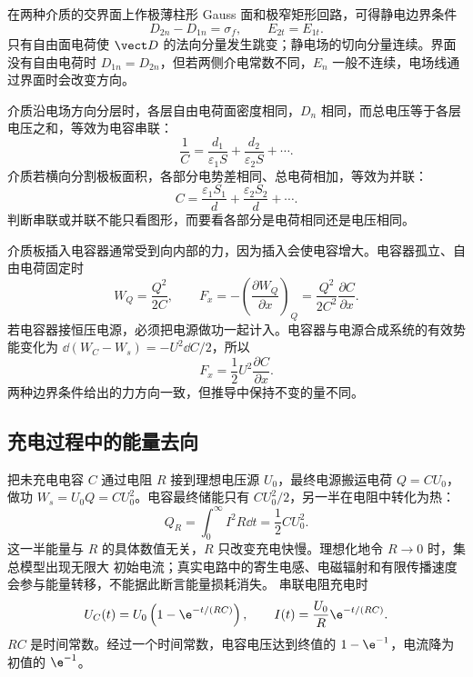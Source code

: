 在两种介质的交界面上作极薄柱形 Gauss 面和极窄矩形回路，可得静电边界条件
\begin{equation}
  \boxed{D_{2n}-D_{1n}=\sigma_f},
  \qquad
  \boxed{E_{2t}=E_{1t}}.
\end{equation}
只有自由面电荷使 $\vect D$ 的法向分量发生跳变；静电场的切向分量连续。界面没有自由电荷时
$D_{1n}=D_{2n}$，但若两侧介电常数不同，$E_n$ 一般不连续，电场线通过界面时会改变方向。

介质沿电场方向分层时，各层自由电荷面密度相同，$D_n$ 相同，而总电压等于各层电压之和，等效为电容串联：
\begin{equation}
  \frac1C=\frac{d_1}{\varepsilon_1S}+\frac{d_2}{\varepsilon_2S}+\cdots.
\end{equation}
介质若横向分割极板面积，各部分电势差相同、总电荷相加，等效为并联：
\begin{equation}
  C=\frac{\varepsilon_1S_1}{d}+\frac{\varepsilon_2S_2}{d}+\cdots.
\end{equation}
判断串联或并联不能只看图形，而要看各部分是电荷相同还是电压相同。

介质板插入电容器通常受到向内部的力，因为插入会使电容增大。电容器孤立、自由电荷固定时
\begin{equation}
  W_Q=\frac{Q^2}{2C},
  \qquad
  F_x=-\left(\frac{\partial W_Q}{\partial x}\right)_Q
  =\frac{Q^2}{2C^2}\frac{\partial C}{\partial x}.
\end{equation}
若电容器接恒压电源，必须把电源做功一起计入。电容器与电源合成系统的有效势能变化为
$\dd(W_C-W_s)=-U^2\dd C/2$，所以
\begin{equation}
  \boxed{F_x=\frac12U^2\frac{\partial C}{\partial x}}.
\end{equation}
两种边界条件给出的力方向一致，但推导中保持不变的量不同。

\subsection*{充电过程中的能量去向}

把未充电电容 $C$ 通过电阻 $R$ 接到理想电压源 $U_0$，最终电源搬运电荷 $Q=CU_0$，做功
$W_s=U_0Q=CU_0^2$。电容最终储能只有 $CU_0^2/2$，另一半在电阻中转化为热：
\begin{equation}
  Q_R=\int_0^\infty I^2R\dd t=\frac12CU_0^2.
\end{equation}
这一半能量与 $R$ 的具体数值无关，$R$ 只改变充电快慢。理想化地令 $R\to0$ 时，集总模型出现无限大
初始电流；真实电路中的寄生电感、电磁辐射和有限传播速度会参与能量转移，不能据此断言能量损耗消失。
串联电阻充电时
\begin{equation}
  U_C(t)=U_0\left(1-\e^{-t/(RC)}\right),
  \qquad
  I(t)=\frac{U_0}{R}\e^{-t/(RC)}.
\end{equation}
$RC$ 是时间常数。经过一个时间常数，电容电压达到终值的 $1-\e^{-1}$，电流降为初值的 $\e^{-1}$。

